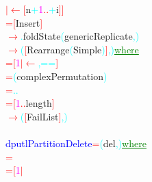 {{\textcolor{red}{\ensuremath{|}}\hsspace \textcolor{red}{\ensuremath{\leftarrow}}\hsspace \textcolor{red}{[}{\rm{}n}\textcolor{cyan}{+}\textcolor{magenta}{1}\hsspace \textcolor{red}{..}\textcolor{cyan}{+}{\rm{}i}\textcolor{red}{]}\textcolor{red}{]}\\\hstab {}\hsspace \hsspace \hsspace \textcolor{red}{=}\hsspace \textcolor{red}{[}{\rm{}Insert}\textcolor{red}{]}\\\hsspace \textcolor{red}{\ensuremath{\rightarrow}}\textcolor{cyan}{.}{\rm{}foldState}\hsspace \textcolor{cyan}{(}{\rm{}genericReplicate}\textcolor{cyan}{,}\textcolor{cyan}{)}\\\hsspace \textcolor{red}{\ensuremath{\rightarrow}}\hsspace \textcolor{cyan}{(}\textcolor{red}{[}{\rm{}Rearrange}\hsspace \textcolor{cyan}{(}{\rm{}Simple}\textcolor{cyan}{)}\textcolor{red}{]}\textcolor{cyan}{,}\textcolor{cyan}{)}\hsspace \textcolor{green}{\underline{where}}\\\hstab {}\hsspace \textcolor{red}{=}\hsspace \textcolor{red}{[}\textcolor{magenta}{1}\hsspace \textcolor{red}{\ensuremath{|}}\hsspace \textcolor{red}{\ensuremath{\leftarrow}}\textcolor{cyan}{,}\hsspace \textcolor{cyan}{==}\textcolor{red}{]}\\\hstab {}\hsspace \hsspace \textcolor{red}{=}\hsspace \textcolor{cyan}{(}{\rm{}complexPermutation}\textcolor{cyan}{)}\\\hstab {}\hsspace \hsspace \textcolor{red}{=}\hsspace \textcolor{cyan}{.}\hsspace \textcolor{cyan}{.}\\\hstab {}\hsspace \textcolor{red}{=}\hsspace \textcolor{red}{[}\textcolor{magenta}{1}\textcolor{red}{..}{\rm{}length}\textcolor{red}{]}\\\hsspace \textcolor{red}{\ensuremath{\rightarrow}}\hsspace \textcolor{cyan}{(}\textcolor{red}{[}{\rm{}FailList}\textcolor{red}{]}\textcolor{cyan}{,}\textcolor{cyan}{)}\\\\\textcolor{blue}{dputlPartitionDelete}\hsspace \textcolor{red}{=}\hsspace \textcolor{cyan}{(}{\rm{}del}\textcolor{cyan}{,}\textcolor{cyan}{)}\hsspace \textcolor{green}{\underline{where}}\\\hsspace \hsspace \textcolor{red}{=}\\\hsspace \textcolor{red}{=}\hsspace \textcolor{red}{[}\textcolor{magenta}{1}\hsspace \textcolor{red}{\ensuremath{|}}\hsspace }}
